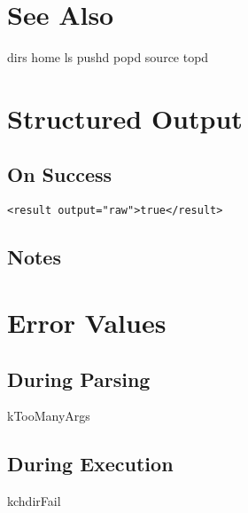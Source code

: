 \documentclass[10pt]{article}
\begin{document}
\section*{ See Also }
\begin{description}
dirs home ls pushd popd source topd

\end{description}
\section*{ Structured Output }
\subsection*{ On Success }
\begin{verbatim}
<result output="raw">true</result>

\end{verbatim}
\subsection*{ Notes }
\section*{ Error Values }
\subsection*{ During Parsing }


 kTooManyArgs
\subsection*{ During Execution }


 kchdirFail
\end{document}
